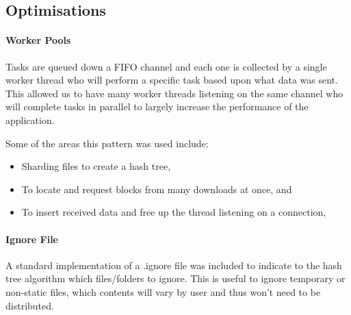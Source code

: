 
\subsection{Optimisations}

\paragraph*{Worker Pools}
Tasks are queued down a FIFO channel and each one is collected by a single worker thread who will perform a specific task based upon what data was sent. This allowed us to have many worker threads listening on the same channel who will complete tasks in parallel to largely increase the performance of the application.

\vspace{2mm}\noindent
Some of the areas this pattern was used include:

\begin{itemize}
  \item Sharding files to create a hash tree,
  \item To locate and request blocks from many downloads at once, and
  \item To insert received data and free up the thread listening on a connection,
\end{itemize}

\paragraph*{Ignore File} A standard implementation of a .ignore file was included to indicate to the hash tree algorithm which files/folders to ignore. This is useful to ignore temporary or non-static files, which contents will vary by user and thus won't need to be distributed.